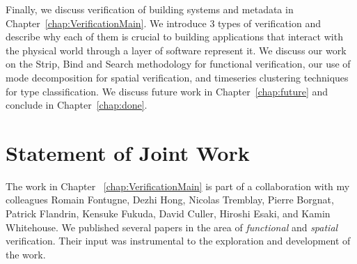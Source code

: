 Finally, we discuss verification of building systems and metadata in Chapter~\ref{chap:VerificationMain}.  We introduce 3 types of 
verification and describe why each of them is crucial to building applications that interact with the physical world through
a layer of software represent it.  We discuss our work on the Strip, Bind and Search methodology for functional verification, 
our use of mode decomposition for spatial verification, and timeseries clustering techniques for type classification.  
We discuss future work in Chapter~\ref{chap:future} and conclude in Chapter~\ref{chap:done}.


\section{Statement of Joint Work}
The work in Chapter ~\ref{chap:VerificationMain} is part of a collaboration with my colleagues Romain Fontugne, Dezhi Hong,
Nicolas Tremblay, Pierre Borgnat, Patrick Flandrin, Kensuke Fukuda, David Culler, Hiroshi Esaki, 
and Kamin Whitehouse.  We published several papers in the area of \emph{functional} \cite{SBS} and \emph{spatial} 
\cite{romain:iotapp12,Hong:2013} verification.  Their input was instrumental to the exploration and development of the work.



























